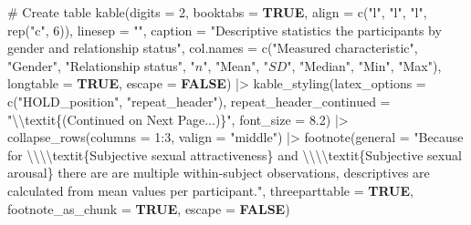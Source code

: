 \documentclass[
  bookmarksnumbered]{article}
\newenvironment{Shaded}{\begin{snugshade}}{\end{snugshade}}
\newcommand{\AttributeTok}[1]{\textcolor[rgb]{0.80,0.80,0.80}{#1}}
\newcommand{\CommentTok}[1]{\textcolor[rgb]{0.50,0.62,0.50}{#1}}
\newcommand{\ConstantTok}[1]{\textcolor[rgb]{0.86,0.64,0.64}{\textbf{#1}}}
\newcommand{\DecValTok}[1]{\textcolor[rgb]{0.86,0.86,0.80}{#1}}
\newcommand{\FloatTok}[1]{\textcolor[rgb]{0.75,0.75,0.82}{#1}}
\newcommand{\FunctionTok}[1]{\textcolor[rgb]{0.94,0.94,0.56}{#1}}
\newcommand{\NormalTok}[1]{\textcolor[rgb]{0.80,0.80,0.80}{#1}}
\newcommand{\SpecialCharTok}[1]{\textcolor[rgb]{0.86,0.64,0.64}{#1}}
\newcommand{\StringTok}[1]{\textcolor[rgb]{0.80,0.58,0.58}{#1}}
\begin{document}
\begin{Shaded}
\begin{Highlighting}[]
  \CommentTok{\# Create table}
  \FunctionTok{kable}\NormalTok{(}\AttributeTok{digits =} \DecValTok{2}\NormalTok{,}
        \AttributeTok{booktabs =} \ConstantTok{TRUE}\NormalTok{,}
        \AttributeTok{align =} \FunctionTok{c}\NormalTok{(}\StringTok{"l"}\NormalTok{, }\StringTok{"l"}\NormalTok{, }\StringTok{"l"}\NormalTok{, }\FunctionTok{rep}\NormalTok{(}\StringTok{"c"}\NormalTok{, }\DecValTok{6}\NormalTok{)),}
        \AttributeTok{linesep =} \StringTok{""}\NormalTok{,}
        \AttributeTok{caption =} \StringTok{"Descriptive statistics the participants by gender}
\StringTok{        and relationship status"}\NormalTok{,}
        \AttributeTok{col.names =} \FunctionTok{c}\NormalTok{(}\StringTok{"Measured characteristic"}\NormalTok{,}
                      \StringTok{"Gender"}\NormalTok{,}
                      \StringTok{"Relationship status"}\NormalTok{,}
                      \StringTok{"$n$"}\NormalTok{,}
                      \StringTok{"Mean"}\NormalTok{,}
                      \StringTok{"$SD$"}\NormalTok{,}
                      \StringTok{"Median"}\NormalTok{,}
                      \StringTok{"Min"}\NormalTok{,}
                      \StringTok{"Max"}\NormalTok{),}
        \AttributeTok{longtable =} \ConstantTok{TRUE}\NormalTok{,}
        \AttributeTok{escape =} \ConstantTok{FALSE}\NormalTok{) }\SpecialCharTok{|\textgreater{}}
  \FunctionTok{kable\_styling}\NormalTok{(}\AttributeTok{latex\_options =} \FunctionTok{c}\NormalTok{(}\StringTok{"HOLD\_position"}\NormalTok{, }\StringTok{"repeat\_header"}\NormalTok{),}
                \AttributeTok{repeat\_header\_continued =} \StringTok{"}\SpecialCharTok{\textbackslash{}\textbackslash{}}\StringTok{textit\{(Continued on Next Page...)\}"}\NormalTok{,}
                \AttributeTok{font\_size =} \FloatTok{8.2}\NormalTok{) }\SpecialCharTok{|\textgreater{}}
  \FunctionTok{collapse\_rows}\NormalTok{(}\AttributeTok{columns =} \DecValTok{1}\SpecialCharTok{:}\DecValTok{3}\NormalTok{, }\AttributeTok{valign =} \StringTok{"middle"}\NormalTok{) }\SpecialCharTok{|\textgreater{}} 
  \FunctionTok{footnote}\NormalTok{(}\AttributeTok{general =} \StringTok{"Because for }\SpecialCharTok{\textbackslash{}\textbackslash{}\textbackslash{}\textbackslash{}}\StringTok{textit\{Subjective sexual attractiveness\} and }
\StringTok{           }\SpecialCharTok{\textbackslash{}\textbackslash{}\textbackslash{}\textbackslash{}}\StringTok{textit\{Subjective sexual arousal\} there are are multiple within{-}subject }
\StringTok{           observations, descriptives are calculated from mean values per participant."}\NormalTok{,}
           \AttributeTok{threeparttable =} \ConstantTok{TRUE}\NormalTok{,}
           \AttributeTok{footnote\_as\_chunk =} \ConstantTok{TRUE}\NormalTok{,}
           \AttributeTok{escape =} \ConstantTok{FALSE}\NormalTok{)}
\end{Highlighting}
\end{Shaded}
\end{document}
